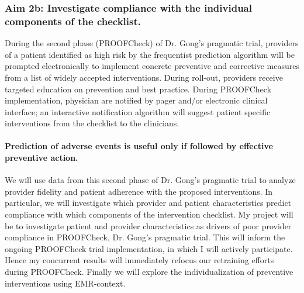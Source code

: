 \documentclass[11pt,notitlepage]{article}
\begin{document}
\subsubsection*{Aim 2b: Investigate compliance with the individual components of the checklist.}

During the second phase (PROOFCheck) of Dr. Gong's pragmatic trial, providers of a patient identified as high risk by the frequentist prediction algorithm will be prompted electronically to implement concrete preventive and corrective measures from a list of widely accepted interventions. During roll-out, providers receive targeted education on prevention and best practice. During PROOFCheck implementation, physician are notified by pager and/or electronic clinical interface; an interactive notification algorithm will suggest patient specific interventions from the checklist to the clinicians. 

\paragraph*{Prediction of adverse events is useful only if followed by effective preventive action. } We will use data from this second phase of Dr. Gong's pragmatic trial to analyze provider fidelity and patient adherence with the proposed interventions. In particular, we will investigate which provider and patient characteristics predict compliance with which components of the intervention checklist. My project will be to investigate patient and provider characteristics as drivers of poor provider compliance in PROOFCheck, Dr. Gong's pragmatic trial. This will inform the ongoing PROOFCheck trial implementation, in which I will actively participate. Hence my concurrent results will immediately refocus our retraining efforts during PROOFCheck. Finally we will explore the individualization of preventive interventions using EMR-context. 
\end{document}
